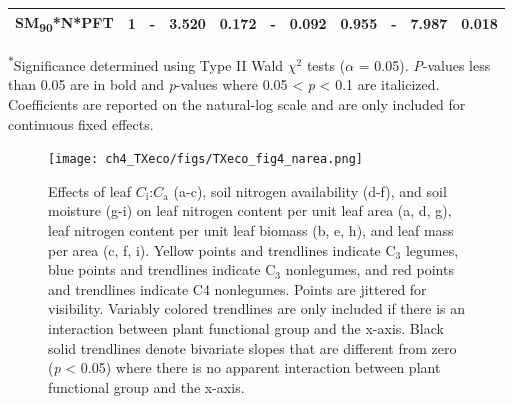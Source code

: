 \begin{landscape}
\begin{table}
{\begin{tabular}{p{3.75cm}p{0.5cm}p{1.75cm}p{1.5cm}p{1.5cm}p{1.75cm}p{1.5cm}p{1.5cm}p{1.75cm}p{1.5cm}p{1.5cm}}
            SM\textsubscript{90}*N*PFT & \multicolumn{1}{r}{1}
            & \multicolumn{1}{r}{-}             & \multicolumn{1}{r}{3.520}         & \multicolumn{1}{r}{0.172}
            & \multicolumn{1}{r}{-}             & \multicolumn{1}{r}{0.092}         & \multicolumn{1}{r}{0.955}
            & \multicolumn{1}{r}{-}             & \multicolumn{1}{r}{7.987}         & \multicolumn{1}{r}{\textbf{0.018}}
            \\
            \hline

    \end{tabular}}
    \label{tab:table4.4}
    \end{table}
    \noindent \textsuperscript{$*$}Significance determined using Type II Wald $\chi^{2}$ tests ($\alpha$ = 0.05). \textit{P}-values less than 0.05 are in bold and \textit{p}-values where 0.05 < \textit{p} < 0.1 are italicized. Coefficients are reported on the natural-log scale and are only included for continuous fixed effects.
\end{landscape}
\clearpage

\newpage
    \begin{figure}
        \centering
        \texttt{[image: ch4\_TXeco/figs/TXeco\_fig4\_narea.png]}
        \caption[Effects of leaf $C_\mathrm{i}$:$C_\mathrm{a}$, soil nitrogen availability, and soil moisture on leaf nitrogen content per unit leaf area, leaf nitrogen content per unit leaf biomass, and leaf mass per area.]{Effects of leaf $C_\mathrm{i}$:$C_\mathrm{a}$ (a-c), soil nitrogen availability (d-f), and soil moisture (g-i) on leaf nitrogen content per unit leaf area (a, d, g), leaf nitrogen content per unit leaf biomass (b, e, h), and leaf mass per area (c, f, i). Yellow points and trendlines indicate C$_3$ legumes, blue points and trendlines indicate C$_3$ nonlegumes, and red points and trendlines indicate C4 nonlegumes. Points are jittered for visibility. Variably colored trendlines are only included if there is an interaction between plant functional group and the x-axis. Black solid trendlines denote bivariate slopes that are different from zero (\textit{p} < 0.05) where there is no apparent interaction between plant functional group and the x-axis.}
        \label{fig:figure4.4}
    \end{figure}
\clearpage

